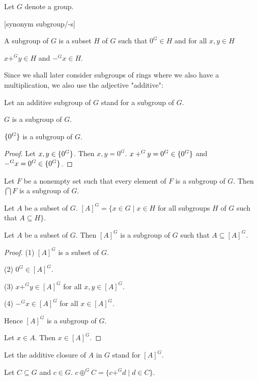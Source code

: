 \documentclass[english,11pt]{article}
\begin{document}
\begin{forthel}

Let $G$ denote a group. 

[synonym subgroup/-s]

\begin{definition} A subgroup of $G$ is a subset $H$ of $G$ such that
$0^{G} \in H$ and for all $x,y \in H$ 

$x +^{G} y \in H$ and $-^{G} x \in H$.
\end{definition}

\end{forthel}
Since we shall later consider subgroups of rings where we also have a multiplication,
we also use the adjective "additive":
\begin{forthel}

Let an additive subgroup of $G$ stand for a subgroup of $G$.

\begin{lemma} $G$ is a subgroup of $G$. \end{lemma}

\begin{lemma} $\{0^{G}\}$ is a subgroup of $G$.
\end{lemma}

\begin{proof}
Let $x,y \in \{0^{G}\}$. Then $x,y = 0^{G}$.
$x +^{G} y = 0^{G} \in \{0^{G}\}$ and $-^{G} x = 0^{G} \in \{0^{G}\}$.
\end{proof}

\begin{lemma} Let $F$ be a nonempty set such that every element of $F$ is a subgroup of $G$.
Then $\bigcap F$ is a subgroup of $G$.
\end{lemma}

\begin{definition}
Let $A$ be a subset of $G$.
$[A]^{G} = \{x \in G \mid x \in H$ for all subgroups $H$ of $G$ 
such that $A \subseteq H\}$.
\end{definition}

\begin{lemma}
Let $A$ be a subset of $G$. Then $[A]^{G}$ is a subgroup of $G$ such
that $A \subseteq [A]^{G}$.
\end{lemma}
\begin{proof}

(1) $[A]^{G}$ is a subset of $G$.

(2) $0^{G} \in [A]^{G}$.

(3) $x +^{G} y \in [A]^{G}$ for all $x,y \in [A]^{G}$.

(4) $-^{G} x \in [A]^{G}$ for all $x \in [A]^{G}$.

Hence $[A]^{G}$ is a subgroup of $G$.

Let $x \in A$. 
Then $x \in [A]^{G}$.
\end{proof}

Let the additive closure of $A$ in $G$ stand for $[A]^{G}$.

\begin{definition}
Let $C \subseteq G$ and $c \in G$.
$c \oplus^{G} C = \{c +^{G} d \mid d \in C\}$.
\end{definition}
\end{forthel}
\end{document}
